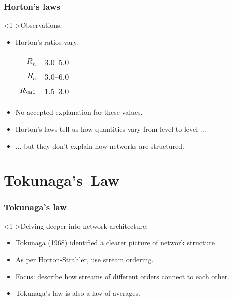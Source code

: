 \begin{frame}[label=]
  \frametitle{Horton's laws}

  \begin{block}<1->{Observations:}
    \begin{itemize}
    \item<1-> Horton's ratios vary:
      \begin{center}
        \begin{tabular}{rl}
          $R_n$               & 3.0--5.0 \\
          $R_a$               & 3.0--6.0 \\
          $R_\msl$               & 1.5--3.0 \\
        \end{tabular}
      \end{center}
    \item<2-> No accepted explanation for these values.
    \item<3-> Horton's laws tell us how quantities vary
      from level to level ...
    \item<4-> ... but they don't explain how networks
      are structured.
    \end{itemize}
  \end{block}

\end{frame}

\section{Tokunaga's\ Law}

\begin{frame}[label=]
  \frametitle{Tokunaga's law}

  \begin{block}<1->{Delving deeper into network architecture:}
    \begin{itemize}
    \item<2-> Tokunaga (1968) identified a clearer picture of network structure\cite{tokunaga1966a,tokunaga1978a,tokunaga1984a}
    \item<3-> As per Horton-Strahler, use \alert{stream ordering}.
    \item<4-> \alert{Focus:} describe how streams of different orders connect to each other.
    \item<5-> Tokunaga's law is also a law of averages.
    \end{itemize}
  \end{block}

\end{frame}


